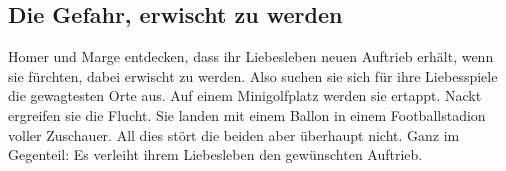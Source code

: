 	
\subsection{Die Gefahr, erwischt zu werden}\label{5F18}
Homer und Marge entdecken, dass ihr Liebesleben neuen Auftrieb erhält, wenn sie fürchten, dabei erwischt zu werden. Also suchen sie sich für ihre Liebesspiele die gewagtesten Orte aus. Auf einem Minigolfplatz werden sie ertappt. Nackt ergreifen sie die Flucht. Sie landen mit einem Ballon in einem Footballstadion voller Zuschauer. All dies stört die beiden aber überhaupt nicht. Ganz im Gegenteil: Es verleiht ihrem Liebesleben den gewünschten Auftrieb.

